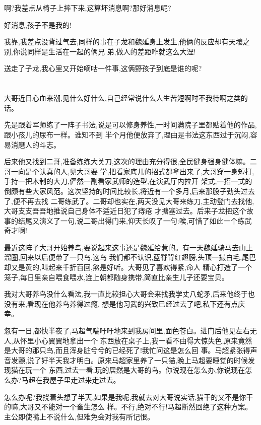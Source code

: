 ﻿\documentclass[12pt,twocolumn]{article}
\begin{document}
啊?我差点从椅子上摔下来,这算坏消息啊?那好消息呢?

好消息,孩子不是我的!

我靠,我差点没背过气去,同样的事在子龙和魏延身上发生,他俩的反应却有天壤之别,你说同样是生活在一起的俩兄
弟,做人的差距咋就这么大涅!

送走了子龙,我心里又开始嘀咕一件事,这俩野孩子到底是谁的呢? 

\section{}

大哥近日心血来潮,见什么好什么,自己经常说什么人生苦短啊时不我待啊之类的话。

先是跟着军师练了一阵子书法,说是可以修身养性,一时间满院子里都贴着他的作品,跟小孩儿的尿布一样。谁知不到
半个月他便放弃了,理由是书法这东西过于沉闷,容易消磨人的斗志。

后来他又找到二哥,准备练练大关刀,这次的理由充分得很,全民健身强身健体嘛。二哥一向是个认真的人,见大哥要
学,把看家底儿的招式都拿出来了,大哥穿一身短打,手持一把木制的大刀,俨然一副看家武师的造型,在演武厅内拉开
架式,一招一式的倒颇有些大家风范。这次坚持的时间比较长,将近有一个多月,后来那股子劲头过去了,便不再去找
二哥练武了。二哥却也实在,两天没见大哥来练刀,主动登门去找他,大哥支支吾吾地推说自己身体不适近日犯了痔疮
才搪塞过去。后来子龙把这个故事的结尾又演义了一句,说二哥出得门来,仰天长叹了一句:唉,可惜了如此一个练武
奇才啊!

最近这阵子大哥开始养鸟,要说起来这事还是魏延给惹的。有一天魏延骑马去山上溜圈,回来以后便带了一只鸟,这鸟
我们都不认识,蓝脊背红翅膀,头顶一撮白毛,尾巴却又是黄的,叫起来千折百回,煞是好听。大哥见了喜欢得紧,命人
精心打造了一个笼子,每日里亲自喂食喂水,连上朝都随身携带,简直比亲生儿子还要宝贝。

我对大哥养鸟没什么看法,我一直比较担心大哥会来找我学丈八蛇矛,后来他终于也没有来,看现在他养鸟养得过瘾,
想是他习武的兴致已经过去了吧,私下还有点庆幸。

忽有一日,都快半夜了,马超气喘吁吁地来到我房间里,面色苍白。进门后他见左右无人,从怀里小心翼翼地拿出一个
东西放在桌子上,我一看不由得大惊失色,原来竟然是大哥的那只鸟,而且浑身脏兮兮的已经死了!我忙问这是怎么回
事。马超紧张得声音发颤,说了好半天我才明白。原来马超家里养了一只猫,晚上马超要睡觉的时候发现猫在玩一个
东西,过去一看,玩的居然是大哥的鸟。你说现在怎么办,你说现在怎么办?马超在我屋子里走过来走过去。

怎么办呢?我挠着头想了半天,如果是我呢,我就去对大哥说实话,猫干的又不是你干的嘛,大哥又不能对一个畜生怎么
样。不行,绝对不行!马超断然回绝了这种方案。主公即使嘴上不说什么,但难免会对我有所记恨。
\end{document}
